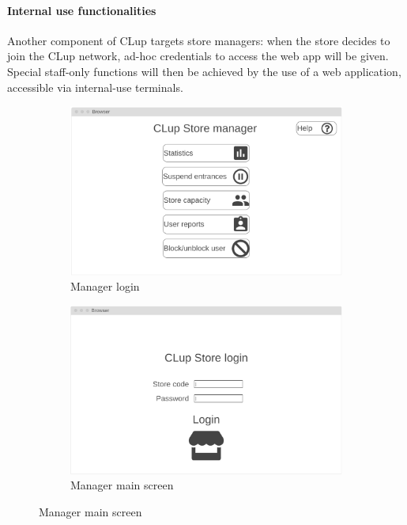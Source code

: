 \paragraph{Internal use functionalities}
Another component of CLup targets store managers: when the store decides to join the CLup network, ad-hoc credentials to access the web app will be given. Special staff-only functions will then be achieved by the use of a web application, accessible via internal-use terminals.
\begin{figure}[h!]
	\centering
	\begin{subfigure}[b]{0.3\textwidth}
		\includegraphics[width=\linewidth]{../Diagrams/WireframesCLup/ManagerMain.png}
		\caption{Manager login}
		\label{fig:WfManagerMain}
	\end{subfigure}
	\hfill
	\begin{subfigure}[b]{0.3\textwidth}
		\includegraphics[width=\linewidth]{../Diagrams/WireframesCLup/ManagerLogin.png}
		\caption{Manager main screen}
		\label{fig:WfManagerLogin}

\end{subfigure}
\end{figure}
